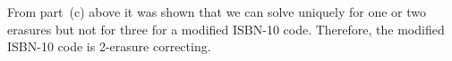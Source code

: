 From part~(c) above it was shown that we can solve uniquely for one or two erasures but not for three for a modified ISBN-10 code. Therefore, the modified ISBN-10 code is 2-erasure correcting.
